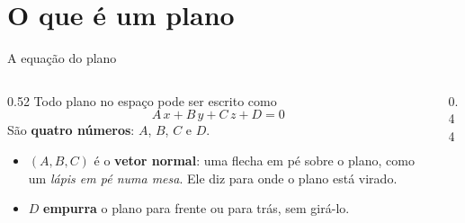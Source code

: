 \documentclass[aspectratio=169,11pt]{beamer}
\newcommand{\bnum}[1]{\textbf{\textcolor{mTeal}{#1}}}
\begin{document}
\section{O que é um plano}

\begin{frame}{A equação do plano}
  \begin{columns}[c]
    \begin{column}{0.52\textwidth}
      Todo plano no espaço pode ser escrito como
      \[ \boxed{\;A\,x + B\,y + C\,z + D = 0\;} \]
      São \bnum{quatro números}: $A$, $B$, $C$ e $D$.
      \bigskip
      \begin{itemize}
        \item $(A, B, C)$ é o \bnum{vetor normal}: uma flecha em pé sobre o plano,
              como um \emph{lápis em pé numa mesa}. Ele diz para onde o plano está virado.
        \item $D$ \bnum{empurra} o plano para frente ou para trás, sem girá-lo.
      \end{itemize}
    \end{column}
    \begin{column}{0.44\textwidth}
      \centering
    \end{column}
  \end{columns}
\end{frame}
\end{document}
